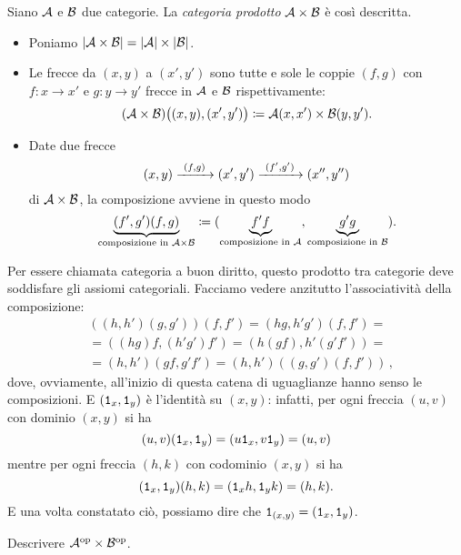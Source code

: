 \begin{costruzione}
Siano \(\mathcal A\) e \(\mathcal B\) due categorie. La {\em categoria prodotto} \(\mathcal A \times \mathcal B\) è così descritta.
\begin{itemize}
\item Poniamo \(\lvert\mathcal A \times \mathcal B\rvert = \lvert\mathcal A\rvert \times \lvert\mathcal B\rvert\).
\item Le frecce da \((x,y)\) a \((x',y')\) sono tutte e sole le coppie \((f,g)\) con \(f : x \to x'\) e \(g : y \to y'\) frecce in \(\mathcal A\) e \(\mathcal B\) rispettivamente:
\[(\mathcal A \times \mathcal B)\big((x, y), (x', y')\big) \coloneq \mathcal A(x, x') \times \mathcal B(y, y') .\]
\item Date due frecce
%
\[(x, y) \xrightarrow{\ (f, g)\ } (x', y') \xrightarrow{\ (f', g')\ } (x'', y'')\]
%
di \(\mathcal A \times \mathcal B\), la composizione avviene in questo modo
\[\underbrace{(f',g')(f,g)}_{\text{composizione in }\mathcal A \times \mathcal B} \coloneq (\underbrace{f'f}_{\text{composizione in }\mathcal A}, \underbrace{g'g}_{\text{composizione in }\mathcal B}) .\]
\end{itemize}
Per essere chiamata categoria a buon diritto, questo prodotto tra categorie deve soddisfare gli assiomi categoriali. Facciamo vedere anzitutto l'associatività della composizione:
\begin{align*}
& ((h,h')(g,g'))(f,f') = (hg,h'g')(f,f') = \\
& = ((hg)f, (h'g')f') = (h(gf), h'(g'f')) = \\
& = (h,h')(gf,g'f') = (h,h')((g,g')(f,f'))\,,
\end{align*}
dove, ovviamente, all'inizio di questa catena di uguaglianze hanno senso le composizioni. E \((\mathtt{1}_x,\mathtt{1}_y)\) è l'identità su \((x,y)\): infatti, per ogni freccia \((u,v)\) con dominio \((x,y)\) si ha
\[(u,v) (\mathtt{1}_x,\mathtt{1}_y) = (u \mathtt{1}_x, v \mathtt{1}_y) = (u,v)\]
mentre per ogni freccia \((h,k)\) con codominio \((x,y)\) si ha
\[(\mathtt{1}_x,\mathtt{1}_y)(h,k) = (\mathtt{1}_x h, \mathtt{1}_y k) = (h,k) .\]
E una volta constatato ciò, possiamo dire che \(\mathtt{1}_{(x,y)} = (\mathtt{1}_x,\mathtt{1}_y)\).
\end{costruzione}

\begin{esercizio}
Descrivere \(\mathcal A^\text{op}\times\mathcal B^\text{op}\).
\end{esercizio}

